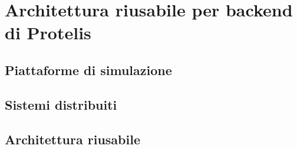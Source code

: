 \chapter{Architettura riusabile per backend di Protelis}
\section{Piattaforme di simulazione}
\section{Sistemi distribuiti}
\section{Architettura riusabile}